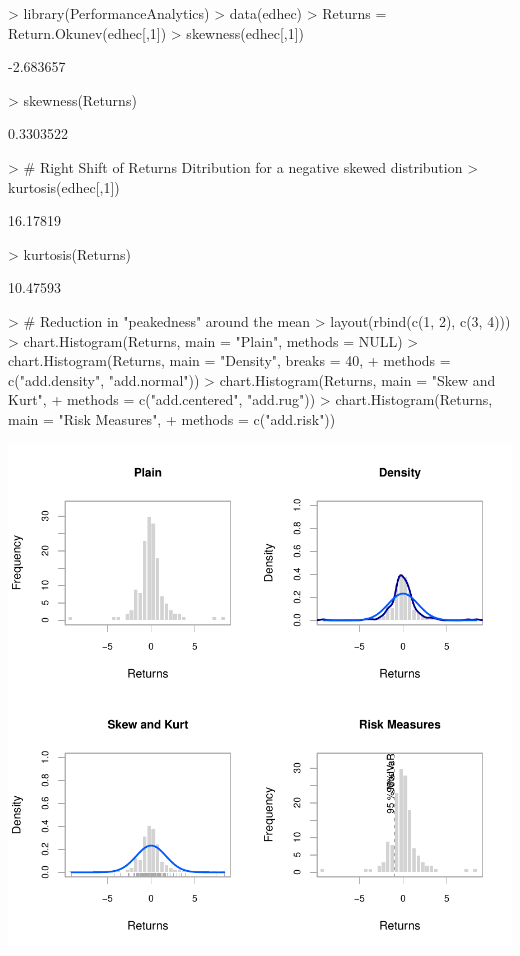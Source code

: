 \documentclass[12pt,letterpaper,english]{article}
\begin{document}
\begin{Schunk}
\begin{Sinput}
> library(PerformanceAnalytics)
> data(edhec)
> Returns = Return.Okunev(edhec[,1])
> skewness(edhec[,1])
\end{Sinput}
\begin{Soutput}
[1] -2.683657
\end{Soutput}
\begin{Sinput}
> skewness(Returns)
\end{Sinput}
\begin{Soutput}
[1] 0.3303522
\end{Soutput}
\begin{Sinput}
> # Right Shift of Returns Ditribution for a negative skewed distribution 
> kurtosis(edhec[,1])
\end{Sinput}
\begin{Soutput}
[1] 16.17819
\end{Soutput}
\begin{Sinput}
> kurtosis(Returns)
\end{Sinput}
\begin{Soutput}
[1] 10.47593
\end{Soutput}
\begin{Sinput}
> # Reduction in "peakedness" around the mean
> layout(rbind(c(1, 2), c(3, 4)))
>  chart.Histogram(Returns, main = "Plain", methods = NULL)
>  chart.Histogram(Returns, main = "Density", breaks = 40,
+  methods = c("add.density", "add.normal"))
>  chart.Histogram(Returns, main = "Skew and Kurt",
+  methods = c("add.centered", "add.rug"))
> chart.Histogram(Returns, main = "Risk Measures",
+  methods = c("add.risk"))
\end{Sinput}
\end{Schunk}
\includegraphics{OkunevWhite-Graph10}
\end{document}
